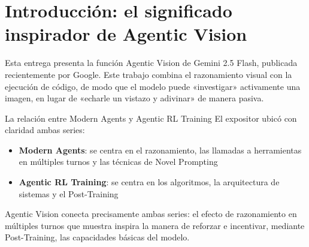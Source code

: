 \section{Introducción: el significado inspirador de Agentic Vision}

Esta entrega presenta la función Agentic Vision de Gemini 2.5 Flash, publicada recientemente por Google. Este trabajo combina el razonamiento visual con la ejecución de código, de modo que el modelo puede «investigar» activamente una imagen, en lugar de «echarle un vistazo y adivinar» de manera pasiva.

\begin{knowledgebox}{La relación entre Modern Agents y Agentic RL Training}
El expositor ubicó con claridad ambas series:
\begin{itemize}
    \item \textbf{Modern Agents}: se centra en el razonamiento, las llamadas a herramientas en múltiples turnos y las técnicas de Novel Prompting
    \item \textbf{Agentic RL Training}: se centra en los algoritmos, la arquitectura de sistemas y el Post-Training
\end{itemize}
Agentic Vision conecta precisamente ambas series: el efecto de razonamiento en múltiples turnos que muestra inspira la manera de reforzar e incentivar, mediante Post-Training, las capacidades básicas del modelo.
\end{knowledgebox}

